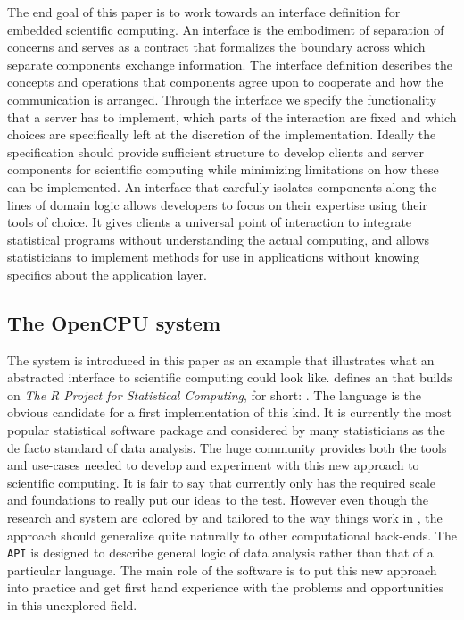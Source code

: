 The end goal of this paper is to work towards an interface definition for embedded scientific computing. An interface is the embodiment of separation of concerns and serves as a contract that formalizes the boundary across which separate components exchange information. The interface definition describes the concepts and operations that components agree upon to cooperate and how the communication is arranged. Through the interface we specify the functionality that a server has to implement, which parts of the interaction are fixed and which choices are specifically left at the discretion of the implementation. Ideally the specification should provide sufficient structure to develop clients and server components for scientific computing while minimizing limitations on how these can be implemented. An interface that carefully isolates components along the lines of domain logic allows developers to focus on their expertise using their tools of choice. It gives clients a universal point of interaction to integrate statistical programs without understanding the actual computing, and allows statisticians to implement methods for use in applications without knowing specifics about the application layer.


\subsection{The OpenCPU system}

The \OpenCPU system is introduced in this paper as an example that illustrates what an abstracted interface to scientific computing could look like. \OpenCPU defines an \HTTP \API that builds on \emph{The R Project for Statistical Computing}, for short: \R \citep{R}. The \R language is the obvious candidate for a first implementation of this kind. It is currently the most popular statistical software package and considered by many statisticians as the de facto standard of data analysis. The huge \R community provides both the tools and use-cases needed to develop and experiment with this new approach to scientific computing. It is fair to say that currently only \R has the required scale and foundations to really put our ideas to the test. However even though the research and \OpenCPU system are colored by and tailored to the way things work in \R, the approach should generalize quite naturally to other computational back-ends. The \texttt{API} is designed to describe general logic of data analysis rather than that of a particular language. The main role of the software is to put this new approach into practice and get first hand experience with the problems and opportunities in this unexplored field. 

